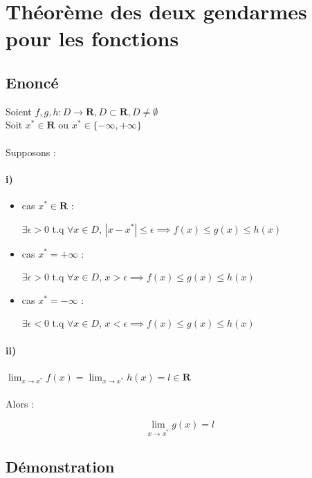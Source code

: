 \documentclass{article}
\begin{document}
\newpage
\section{Théorème des deux gendarmes pour les fonctions}

\subsection{Enoncé}

Soient $ f, g, h: D \to \mathbf{R}, D \subset \mathbf{R}, D \neq \emptyset $\\
Soit $ x^* \in \mathbf{R} $ ou $ x^* \in \{-\infty, +\infty\}$\\\\
Supposons :

\paragraph{i)}

\begin{itemize}
    \item cas $ x^* \in \mathbf{R} $ :

$ \exists \epsilon > 0 $ t.q $ \forall x \in D $, $ |x-x^*| \leq \epsilon \implies f(x) \leq g(x) \leq h(x) $

\item cas $ x^* = +\infty $ :

$ \exists \epsilon > 0 $ t.q $ \forall x \in D $, $ x > \epsilon \implies f(x) \leq g(x) \leq h(x) $

\item cas $ x^* = -\infty $ :

$ \exists \epsilon < 0 $ t.q $ \forall x \in D $, $ x < \epsilon \implies f(x) \leq g(x) \leq h(x) $

\end{itemize}

\paragraph{ii)}

$ \lim_{x\to{x^*}} f(x) = \lim_{x\to{x^*}} h(x) = l \in \mathbf{R} $\\\\
Alors : 

\[ \lim_{x\to{x^*}} g(x) = l \]

\subsection{Démonstration}
\end{document}
